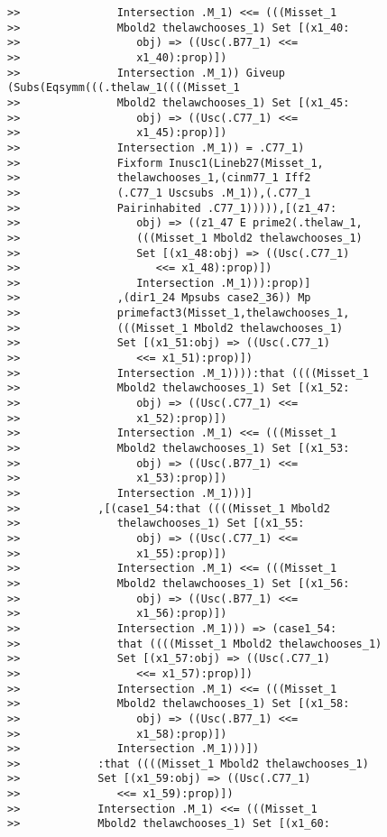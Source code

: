 \documentclass[12pt]{article}
\begin{document}
\begin{verbatim}
>>               Intersection .M_1) <<= (((Misset_1
>>               Mbold2 thelawchooses_1) Set [(x1_40:
>>                  obj) => ((Usc(.B77_1) <<=
>>                  x1_40):prop)])
>>               Intersection .M_1)) Giveup (Subs(Eqsymm(((.thelaw_1((((Misset_1
>>               Mbold2 thelawchooses_1) Set [(x1_45:
>>                  obj) => ((Usc(.C77_1) <<=
>>                  x1_45):prop)])
>>               Intersection .M_1)) = .C77_1)
>>               Fixform Inusc1(Lineb27(Misset_1,
>>               thelawchooses_1,(cinm77_1 Iff2
>>               (.C77_1 Uscsubs .M_1)),(.C77_1
>>               Pairinhabited .C77_1))))),[(z1_47:
>>                  obj) => ((z1_47 E prime2(.thelaw_1,
>>                  (((Misset_1 Mbold2 thelawchooses_1)
>>                  Set [(x1_48:obj) => ((Usc(.C77_1)
>>                     <<= x1_48):prop)])
>>                  Intersection .M_1))):prop)]
>>               ,(dir1_24 Mpsubs case2_36)) Mp
>>               primefact3(Misset_1,thelawchooses_1,
>>               (((Misset_1 Mbold2 thelawchooses_1)
>>               Set [(x1_51:obj) => ((Usc(.C77_1)
>>                  <<= x1_51):prop)])
>>               Intersection .M_1)))):that ((((Misset_1
>>               Mbold2 thelawchooses_1) Set [(x1_52:
>>                  obj) => ((Usc(.C77_1) <<=
>>                  x1_52):prop)])
>>               Intersection .M_1) <<= (((Misset_1
>>               Mbold2 thelawchooses_1) Set [(x1_53:
>>                  obj) => ((Usc(.B77_1) <<=
>>                  x1_53):prop)])
>>               Intersection .M_1)))]
>>            ,[(case1_54:that ((((Misset_1 Mbold2
>>               thelawchooses_1) Set [(x1_55:
>>                  obj) => ((Usc(.C77_1) <<=
>>                  x1_55):prop)])
>>               Intersection .M_1) <<= (((Misset_1
>>               Mbold2 thelawchooses_1) Set [(x1_56:
>>                  obj) => ((Usc(.B77_1) <<=
>>                  x1_56):prop)])
>>               Intersection .M_1))) => (case1_54:
>>               that ((((Misset_1 Mbold2 thelawchooses_1)
>>               Set [(x1_57:obj) => ((Usc(.C77_1)
>>                  <<= x1_57):prop)])
>>               Intersection .M_1) <<= (((Misset_1
>>               Mbold2 thelawchooses_1) Set [(x1_58:
>>                  obj) => ((Usc(.B77_1) <<=
>>                  x1_58):prop)])
>>               Intersection .M_1)))])
>>            :that ((((Misset_1 Mbold2 thelawchooses_1)
>>            Set [(x1_59:obj) => ((Usc(.C77_1)
>>               <<= x1_59):prop)])
>>            Intersection .M_1) <<= (((Misset_1
>>            Mbold2 thelawchooses_1) Set [(x1_60:

\end{verbatim}
\end{document}
